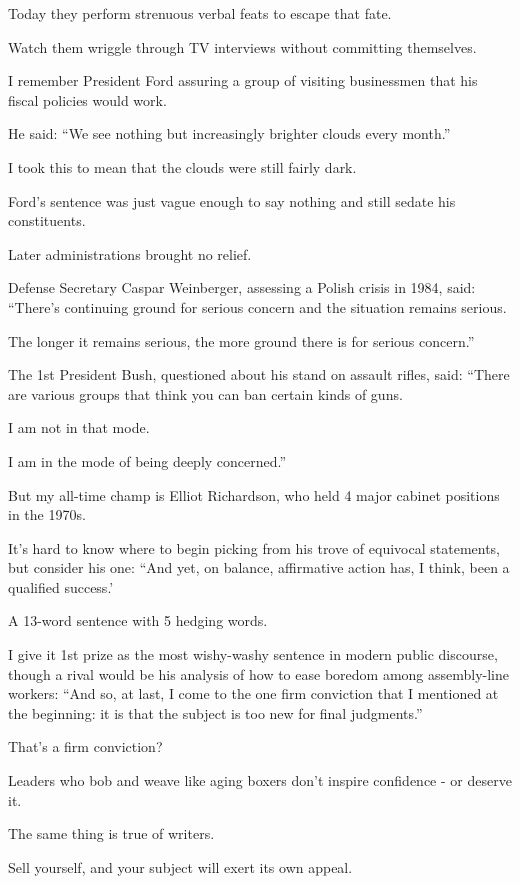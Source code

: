\documentclass{book}
\numberwithin{equation}{section}
\begin{document}
Today they perform strenuous verbal feats to escape that fate.

Watch them wriggle through TV interviews without committing themselves.

I remember President Ford assuring a group of visiting businessmen that his fiscal policies would work.

He said: ``We see nothing but increasingly brighter clouds every month.''

I took this to mean that the clouds were still fairly dark.

Ford's sentence was just vague enough to say nothing and still sedate his constituents.

%
Later administrations brought no relief.

Defense Secretary Caspar Weinberger, assessing a Polish crisis in 1984, said: ``There's continuing ground for serious concern and the situation remains serious.

The longer it remains serious, the more ground there is for serious concern.''

The 1st President Bush, questioned about his stand on assault rifles, said: ``There are various groups that think you can ban certain kinds of guns.

I am not in that mode.

I am in the mode of being deeply concerned.''

%
But my all-time champ is Elliot Richardson, who held 4 major cabinet positions in the 1970s.

It's hard to know where to begin picking from his trove of equivocal statements, but consider his one: ``And yet, on balance, affirmative action has, I think, been a qualified success.'

A 13-word sentence with 5 hedging words.

I give it 1st prize as the most wishy-washy sentence in modern public discourse, though a rival would be his analysis of how to ease boredom among assembly-line workers: ``And so, at last, I come to the one firm conviction that I mentioned at the beginning: it is that the subject is too new for final judgments.''

%
That's a firm conviction?

Leaders who bob and weave like aging boxers don't inspire confidence - or deserve it.

The same thing is true of writers.

Sell yourself, and your subject will exert its own appeal.
\end{document}
